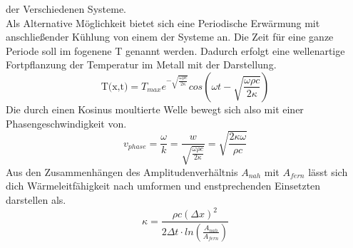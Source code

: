 der Verschiedenen Systeme.
\\
\newline
Als Alternative Möglichkeit bietet sich eine Periodische Erwärmung mit anschließender Kühlung von einem der Systeme an.
Die Zeit für eine ganze Periode soll im fogenene T genannt werden.
Dadurch erfolgt eine wellenartige Fortpflanzung der Temperatur im Metall mit der Darstellung.
\begin{equation}
    \label{eqn:nqe}
    \text{T(x,t)}=T_{max}e^{- \sqrt{\frac{\omega \rho c}{2 \kappa}}}cos \left (\omega t - \sqrt{\frac{\omega \rho c}{2 \kappa}} \right)
\end{equation}
Die durch einen Kosinus moultierte Welle bewegt sich also mit einer Phasengeschwindigkeit von.
\begin{equation}
    \label{eqn:v}
    v_{phase}= \frac{\omega}{k} = \frac{w}{\sqrt{\frac{\omega \rho c}{2 \kappa}}} = \sqrt{\frac{2\kappa \omega}{\rho c}}
\end{equation}
Aus den Zusammenhängen des Amplitudenverhältnis $A_{nah}$ mit $A_{fern}$ lässt sich dich Wärmeleitfähigkeit nach umformen
und enstprechenden Einsetzten darstellen als.
\begin{equation}
    \label{eqn:kappa}
    \kappa = \frac{\rho c \left ( \Delta x \right )^2}{2 \Delta t \cdot ln \left (\frac{A_{nah}}{A_{fern}}\right)}
\end{equation}